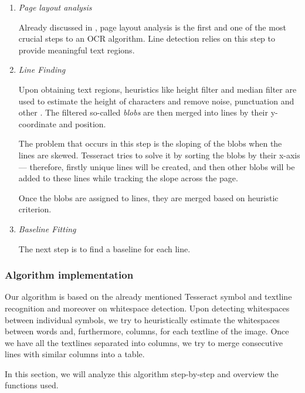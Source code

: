 \begin{enumerate}
    \item \emph{Page layout analysis}
    
    Already discussed in , page layout analysis is the first and one of the most crucial steps to an OCR algorithm. Line detection relies on this step to provide meaningful text regions.
    
    \item \emph{Line Finding}
     
     Upon obtaining text regions, heuristics like height filter and median filter are used to estimate the height of characters and remove noise, punctuation and other . The filtered so-called \emph{blobs} are then merged into lines by their y-coordinate and position.
     
     The problem that occurs in this step is the sloping of the blobs when the lines are skewed. Tesseract tries to solve it by sorting the blobs by their x-axis --- therefore, firstly unique lines will be created, and then other blobs will be added to these lines while tracking the slope across the page.
     
     Once the blobs are assigned to lines, they are merged based on heuristic criterion.
     
     \item \emph{Baseline Fitting}
    
    The next step is to find a baseline for each line.
    
    
\end{enumerate}


\subsubsection{Algorithm implementation}

Our algorithm is based on the already mentioned Tesseract symbol and textline recognition and moreover on whitespace detection. Upon detecting whitespaces between individual symbols, we try to heuristically estimate the whitespaces between words and, furthermore, columns, for each textline of the image. Once we have all the textlines separated into columns, we try to merge consecutive lines with similar columns into a table.  

In this section, we will analyze this algorithm step-by-step and overview the functions used.

